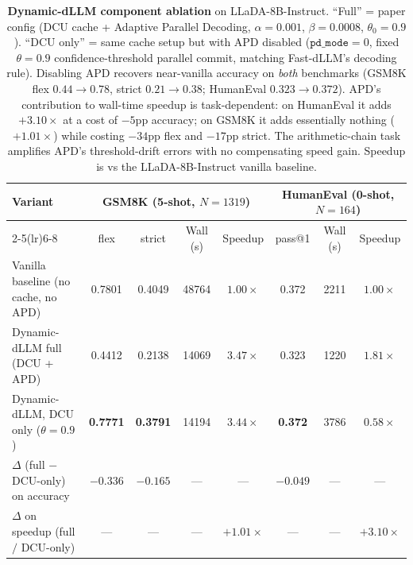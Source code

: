 \begin{table}[t]
\centering
\caption{\textbf{Dynamic-dLLM component ablation} on LLaDA-8B-Instruct.
``Full'' = paper config (DCU cache + Adaptive Parallel Decoding, $\alpha{=}0.001$, $\beta{=}0.0008$, $\theta_0{=}0.9$).
``DCU only'' = same cache setup but with APD disabled ($\texttt{pd\_mode}{=}0$, fixed $\theta{=}0.9$ confidence-threshold parallel commit, matching Fast-dLLM's decoding rule).
Disabling APD recovers near-vanilla accuracy on \emph{both} benchmarks (GSM8K flex $0.44{\to}0.78$, strict $0.21{\to}0.38$; HumanEval $0.323{\to}0.372$). APD's contribution to wall-time speedup is task-dependent: on HumanEval it adds $+3.10\times$ at a cost of $-5\text{pp}$ accuracy; on GSM8K it adds essentially nothing ($+1.01\times$) while costing $-34\text{pp}$ flex and $-17\text{pp}$ strict. The arithmetic-chain task amplifies APD's threshold-drift errors with no compensating speed gain.
Speedup is vs the LLaDA-8B-Instruct vanilla baseline.}
\label{tab:ablation-dynamic-dllm}
\small
\setlength{\tabcolsep}{4pt}
\begin{tabular}{lccccccc}
\toprule
\multirow{2}{*}{Variant}
   & \multicolumn{4}{c}{GSM8K (5-shot, $N{=}1319$)}
   & \multicolumn{3}{c}{HumanEval (0-shot, $N{=}164$)} \\
\cmidrule(lr){2-5}\cmidrule(lr){6-8}
   & flex & strict & Wall (s) & Speedup
   & pass@1 & Wall (s) & Speedup \\
\midrule
Vanilla baseline (no cache, no APD)         & 0.7801 & 0.4049 & 48764 & $1.00\times$
                                             & 0.372  & 2211   & $1.00\times$ \\
Dynamic-dLLM full (DCU + APD)               & 0.4412 & 0.2138 & 14069 & $3.47\times$
                                             & 0.323  & 1220   & $1.81\times$ \\
Dynamic-dLLM, DCU only ($\theta{=}0.9$)     & \textbf{0.7771} & \textbf{0.3791} & 14194 & $3.44\times$
                                             & \textbf{0.372} & 3786 & $0.58\times$ \\
\midrule
$\Delta$ (full $-$ DCU-only) on accuracy    & $-0.336$ & $-0.165$ & --- & ---
                                             & $-0.049$ & --- & --- \\
$\Delta$ on speedup (full $/$ DCU-only)     & ---  & ---  & ---  & $+1.01\times$
                                             & ---  & ---  & $+3.10\times$ \\
\bottomrule
\end{tabular}
\end{table}
